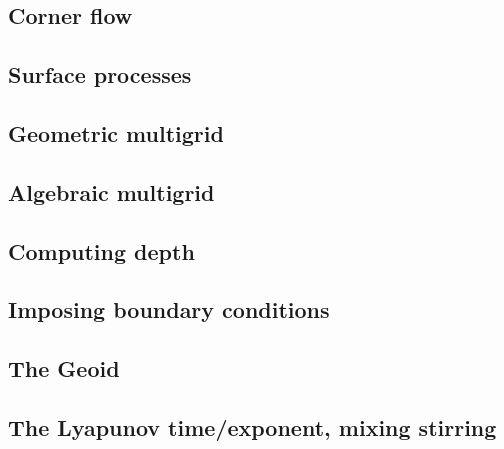 \subsection{Corner flow} \label{sec:cornerflow}  %
\newpage %
\subsection{Surface processes \label{sec:surfaceprocesses}}  %
\newpage %
\subsection{Geometric multigrid}  %
\newpage %
\subsection{Algebraic multigrid}  %
\newpage %
\subsection{Computing depth \label{ss:depth}}  %
\newpage %
\subsection{Imposing boundary conditions \label{ss:howtobc}}  %
\newpage %
\subsection{The Geoid} \label{ss:geoid}  %
\newpage %
\subsection{The Lyapunov time/exponent, mixing stirring}\label{ss:lyapunov} %
\newpage %
